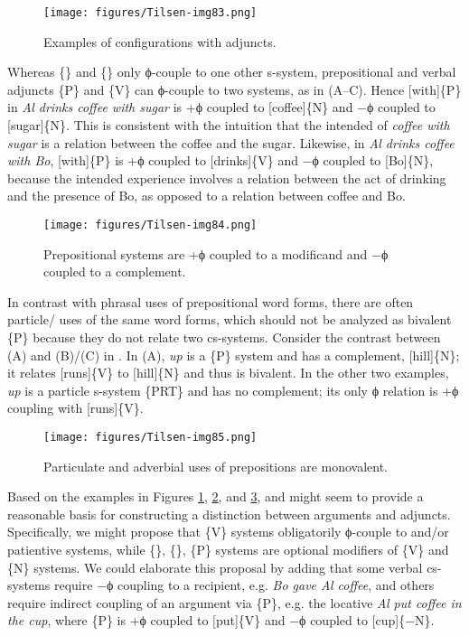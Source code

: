   
\begin{figure}
\texttt{[image: figures/Tilsen-img83.png]}
\caption{Examples of configurations with adjuncts.}
\label{fig:4:33}
\end{figure}
 

  Whereas \{\} and \{\} only ϕ-couple to one other s-system, prepositional and verbal adjuncts \{P\} and \{V\} can ϕ-couple to two systems, as in {}(A--C). Hence [with]\{P\} in \textit{Al drinks coffee with sugar} is +ϕ coupled to [coffee]\{N\} and −ϕ coupled to [sugar]\{N\}. This is consistent with the intuition that the intended  of \textit{coffee with sugar} is a relation between the coffee and the sugar. Likewise, in \textit{Al drinks coffee with Bo}, [with]\{P\} is +ϕ coupled to [drinks]\{V\} and −ϕ coupled to [Bo]\{N\}, because the intended experience involves a relation between the act of drinking and the presence of Bo, as opposed to a relation between coffee and Bo.

  
\begin{figure}
\texttt{[image: figures/Tilsen-img84.png]}
\caption{Prepositional systems are +ϕ coupled to a modificand and −ϕ coupled to a complement.}
\label{fig:4:34}
\end{figure}
 

  In contrast with phrasal uses of prepositional word forms, there are often particle/ uses of the same word forms, which should not be analyzed as bivalent \{P\} because they do not relate two cs-systems. Consider the contrast between (A) and (B)/(C) in {}. In (A), \textit{up} is a \{P\} system and has a complement, [hill]\{N\}; it relates [runs]\{V\} to [hill]\{N\} and thus is bivalent. In the other two examples, \textit{up} is a particle s-system \{PRT\} and has no complement; its only ϕ relation is +ϕ coupling with [runs]\{V\}.

  
\begin{figure}
\texttt{[image: figures/Tilsen-img85.png]}
\caption{Particulate and adverbial uses of prepositions are monovalent.}
\label{fig:4:35}
\end{figure}\clearpage
 

  Based on the examples in Figures {\ref{fig:4:33}}, {\ref{fig:4:34}}, and {\ref{fig:4:35}},  and  might seem to provide a reasonable basis for constructing a distinction between arguments and adjuncts. Specifically, we might propose that \{V\} systems obligatorily ϕ-couple to  and/or patientive systems, while \{\}, \{\}, \{P\} systems are optional modifiers of \{V\} and \{N\} systems. We could elaborate this proposal by adding that some verbal cs-systems require −ϕ coupling to a recipient, e.g. \textit{Bo gave Al coffee}, and others require indirect coupling of an argument via \{P\}, e.g. the locative \textit{Al put coffee in the cup}, where \{P\} is +ϕ coupled to [put]\{V\} and −ϕ coupled to [cup]\{−N\}.

